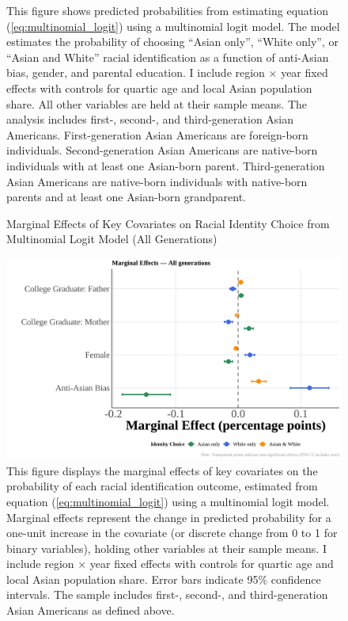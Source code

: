 \begin{center}
\begin{figure}[!htb]
\caption*{\footnotesize{This figure shows predicted probabilities from estimating equation (\ref{eq:multinomial_logit}) using a multinomial logit model. The model estimates the probability of choosing ``Asian only'', ``White only'', or ``Asian and White'' racial identification as a function of anti-Asian bias, gender, and parental education. I include region $\times$ year fixed effects with controls for quartic age and local Asian population share. All other variables are held at their sample means. The analysis includes first-, second-, and third-generation Asian Americans. First-generation Asian Americans are foreign-born individuals. Second-generation Asian Americans are native-born individuals with at least one Asian-born parent. Third-generation Asian Americans are native-born individuals with native-born parents and at least one Asian-born grandparent.}}
\end{figure}
\end{center}

\pagebreak
\newpage

\begin{center}
\begin{figure}[!htb]
\centering
\caption{Marginal Effects of Key Covariates on Racial Identity Choice from Multinomial Logit Model (All Generations)}
\label{fig:marginal-effects-all}
\includegraphics[width=0.9\linewidth]{optimized_marginal_effects_all.png}
\caption*{\footnotesize{This figure displays the marginal effects of key covariates on the probability of each racial identification outcome, estimated from equation (\ref{eq:multinomial_logit}) using a multinomial logit model. Marginal effects represent the change in predicted probability for a one-unit increase in the covariate (or discrete change from 0 to 1 for binary variables), holding other variables at their sample means. I include region $\times$ year fixed effects with controls for quartic age and local Asian population share. Error bars indicate 95\% confidence intervals. The sample includes first-, second-, and third-generation Asian Americans as defined above.}}
\end{figure}
\end{center}

